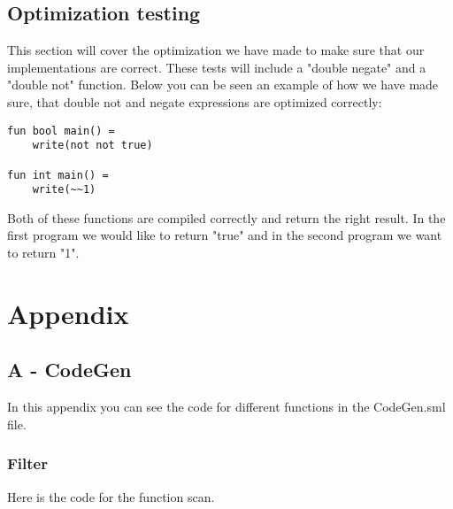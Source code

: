 \documentclass[12pt]{article}
\begin{document}
\subsection{Optimization testing}
This section will cover the optimization we have made to make sure that our implementations are correct. These tests will include a "double negate" and a "double not" function. Below you can be seen an example of how we have made sure, that double not and negate expressions are optimized correctly:
\begin{verbatim}
fun bool main() =
    write(not not true)
    
fun int main() =
    write(~~1)
\end{verbatim}
Both of these functions are compiled correctly and return the right result. In the first program we would like to return "true" and in the second program we want to return "1".

\pagebreak

\section{Appendix}
\subsection{A - CodeGen}
In this appendix you can see the code for different functions in the CodeGen.sml file.

\subsubsection{Filter}
Here is the code for the function scan. 
\end{document}
